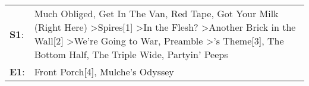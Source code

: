 \begin{supertabular}{p{0.03\textwidth}p{0.92\textwidth}}
 \textbf{S1}:  &  Much Obliged\textsuperscript{}, \enspace Get In The Van\textsuperscript{}, \enspace Red Tape\textsuperscript{}, \enspace Got Your Milk (Right Here)\textsuperscript{} \textgreater \enspace Spires[1]\textsuperscript{} \textgreater \enspace In the Flesh?\textsuperscript{} \textgreater \enspace Another Brick in the Wall[2]\textsuperscript{} \textgreater \enspace We're Going to War\textsuperscript{}, \enspace Preamble\textsuperscript{} \textgreater {}'s Theme[3]\textsuperscript{}, \enspace The Bottom Half\textsuperscript{}, \enspace The Triple Wide\textsuperscript{}, \enspace Partyin' Peeps\textsuperscript{}  \enspace  \\
 \textbf{E1}:  &                                                                                                                                                                                                                                                                                                                                                                                                                                                                                                                                                                Front Porch[4]\textsuperscript{}, \enspace Mulche's Odyssey\textsuperscript{}  \enspace  \\
\end{supertabular}
